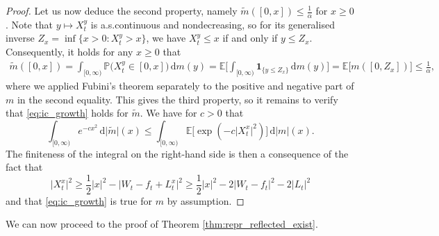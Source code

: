 \documentclass[11pt, a4paper]{article}
\theoremstyle{plain}
\theoremstyle{definition}
\theoremstyle{remark}
\numberwithin{equation}{section}
\newcommand{\ev}{\mathbb{E}}
\newcommand{\pr}{\mathbb{P}}
\renewcommand{\d}{\mathrm{d}}
\newcommand{\define}{\mathpunct{:}}
\renewcommand{\bf}[1]{\mathbf{#1}}
\begin{document}
\begin{proof}
Let us now deduce the second property, namely $\tilde{m}([0, x]) \leq \frac{1}{\alpha}$ for $x \geq 0$. Note that $y \mapsto X^y_t$ is a.s.\@ continuous and nondecreasing, so for its generalised inverse $Z_x = \inf\{x > 0 \define X^y_t > x\}$, we have $X^y_t \leq x$ if and only if $y \leq Z_x$. Consequently, it holds for any $x \geq 0$ that
\begin{align*}
    \tilde{m}([0, x]) = \int_{[0, \infty)} \pr\bigl(X^y_t \in [0, x]\bigr) \, \d m(y) = \ev\biggl[\int_{[0, \infty)} \bf{1}_{\{y \leq Z_x\}} \, \d m(y)\biggr] = \ev\bigl[m([0, Z_x])\bigr] \leq \frac{1}{\alpha},
\end{align*}
where we applied Fubini's theorem separately to the positive and negative part of $m$ in the second equality. This gives the third property, so it remains to verify that \eqref{eq:ic_growth} holds for $\tilde{m}$. We have for $c > 0$ that
\begin{equation*}
    \int_{[0, \infty)} e^{-cx^2} \, \d \lvert \tilde{m}\rvert(x) \leq \int_{[0, \infty)} \ev\bigl[\exp(- c\lvert X^x_t\rvert^2)\bigr] \, \d \lvert m\rvert(x).
\end{equation*}
The finiteness of the integral on the right-hand side is then a consequence of the fact that
\begin{equation*}
    \lvert X^x_t\rvert^2 \geq \frac{1}{2}\lvert x\rvert^2 - \bigl\lvert W_t - f_t + L^x_t\bigr\rvert^2 \geq \frac{1}{2}\lvert x\rvert^2 - 2 \lvert W_t - f_t\rvert^2 - 2 \lvert L_t\rvert^2
\end{equation*}
and that \eqref{eq:ic_growth} is true for $m$ by assumption.
\end{proof}

We can now proceed to the proof of Theorem \ref{thm:repr_reflected_exist}. 
\end{document}
